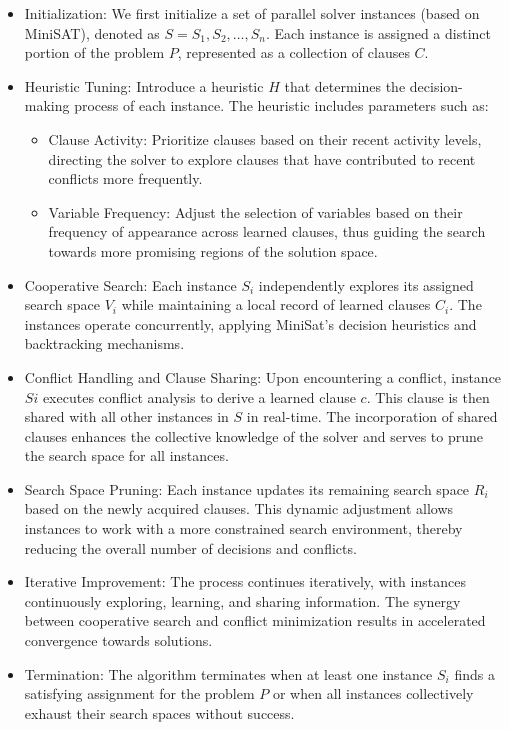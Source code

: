 \documentclass{article}
\begin{document}
\begin{itemize}
    \item Initialization: We first initialize a set of parallel solver instances (based on MiniSAT), denoted as $S = {S_1,S_2,…,S_n}$. Each instance is assigned a distinct portion of the problem $P$, represented as a collection of clauses $C$.
    \item Heuristic Tuning: Introduce a heuristic $H$ that determines the decision-making process of each instance. The heuristic includes parameters such as:
    \begin{itemize}
        \item Clause Activity: Prioritize clauses based on their recent activity levels, directing the solver to explore clauses that have contributed to recent conflicts more frequently.
        \item Variable Frequency: Adjust the selection of variables based on their frequency of appearance across learned clauses, thus guiding the search towards more promising regions of the solution space.
    \end{itemize}
    \item Cooperative Search: Each instance $S_i$ independently explores its assigned search space $V_i$ while maintaining a local record of learned clauses $C_i$. The instances operate concurrently, applying MiniSat's decision heuristics and backtracking mechanisms.
    \item Conflict Handling and Clause Sharing: Upon encountering a conflict, instance $Si$ executes conflict analysis to derive a learned clause $c$. This clause is then shared with all other instances in $S$ in real-time.
    The incorporation of shared clauses enhances the collective knowledge of the solver and serves to prune the search space for all instances.
    \item Search Space Pruning: Each instance updates its remaining search space $R_i$ based on the newly acquired clauses. This dynamic adjustment allows instances to work with a more constrained search environment, thereby reducing the overall number of decisions and conflicts.

    \item Iterative Improvement: The process continues iteratively, with instances continuously exploring, learning, and sharing information. The synergy between cooperative search and conflict minimization results in accelerated convergence towards solutions.

    \item Termination: The algorithm terminates when at least one instance $S_i$ finds a satisfying assignment for the problem $P$ or when all instances collectively exhaust their search spaces without success.
\end{itemize}
\end{document}
